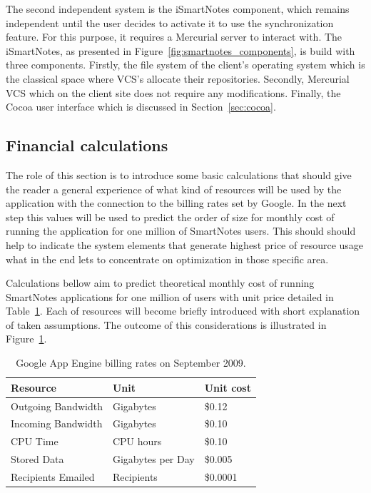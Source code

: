 The second independent system is the iSmartNotes component, which remains independent until the user decides to activate it to use the synchronization feature. For this purpose, it requires a Mercurial server to interact with. The iSmartNotes, as presented in Figure~\ref{fig:smartnotes_components}, is build with three components. Firstly, the file system of the client's operating system which is the classical space where VCS's allocate their repositories. Secondly, Mercurial VCS which on the client site does not require any modifications. Finally, the Cocoa user interface which is  discussed in Section~\ref{sec:cocoa}.

\subsection{Financial calculations}\label{subsec:gae_calculations}
The role of this section is to introduce some basic calculations that should give the reader a general experience of what kind of resources will be used by the application with the connection to the billing rates set by Google. In the next step this values will be used to predict the order of size for monthly cost of running the application for  one million of SmartNotes users. This should should help to indicate the system elements that generate highest price of resource usage what in the end lets to concentrate on optimization in those specific area. 

Calculations bellow aim to predict theoretical monthly cost of running SmartNotes applications for one million of users with unit price detailed in Table~\ref{tab:gae_cost}. Each of resources will become briefly introduced with short explanation of taken assumptions. The outcome of this considerations is illustrated in Figure~\ref{tab:gae_cost}.
\begin{table}[h]
\centering
\caption{Google App Engine billing rates on September 2009.}
\label{tab:gae_cost}
\begin{tabular}{|l|l|l|} \hline \hline
\textbf{Resource} & \textbf{Unit} & \textbf{Unit cost} \\ \hline \hline
Outgoing Bandwidth & Gigabytes & \$0.12 \\ \hline
Incoming Bandwidth & Gigabytes & \$0.10 \\ \hline
CPU Time & CPU hours & \$0.10 \\ \hline
Stored Data & Gigabytes per Day & \$0.005 \\ \hline
Recipients Emailed & Recipients & \$0.0001\\ \hline \hline
\end{tabular}
\end{table}

